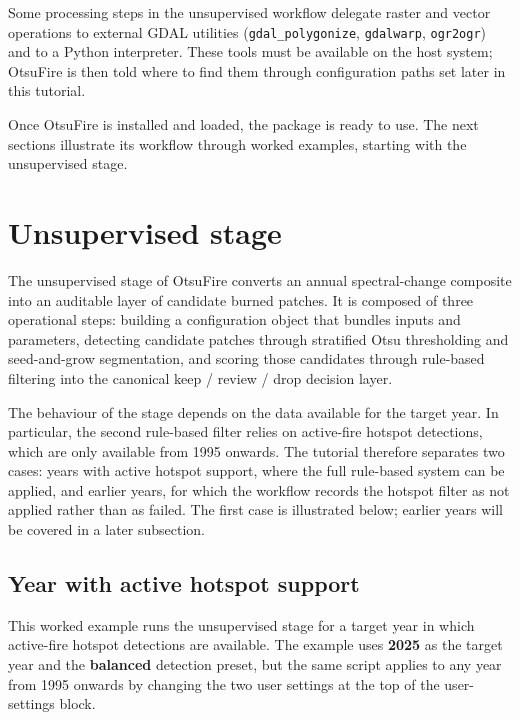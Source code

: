 \documentclass[
  british,
  a4paper,
]{scrbook}
\begin{document}
Some processing steps in the unsupervised workflow delegate raster and
vector operations to external GDAL utilities (\texttt{gdal\_polygonize},
\texttt{gdalwarp}, \texttt{ogr2ogr}) and to a Python interpreter. These
tools must be available on the host system; OtsuFire is then told where
to find them through configuration paths set later in this tutorial.

Once OtsuFire is installed and loaded, the package is ready to use. The
next sections illustrate its workflow through worked examples, starting
with the unsupervised stage.

\section{Unsupervised stage}\label{unsupervised-stage-1}

The unsupervised stage of OtsuFire converts an annual spectral-change
composite into an auditable layer of candidate burned patches. It is
composed of three operational steps: building a configuration object
that bundles inputs and parameters, detecting candidate patches through
stratified Otsu thresholding and seed-and-grow segmentation, and scoring
those candidates through rule-based filtering into the canonical keep /
review / drop decision layer.

The behaviour of the stage depends on the data available for the target
year. In particular, the second rule-based filter relies on active-fire
hotspot detections, which are only available from 1995 onwards. The
tutorial therefore separates two cases: years with active hotspot
support, where the full rule-based system can be applied, and earlier
years, for which the workflow records the hotspot filter as not applied
rather than as failed. The first case is illustrated below; earlier
years will be covered in a later subsection.

\subsection{Year with active hotspot
support}\label{year-with-active-hotspot-support}

This worked example runs the unsupervised stage for a target year in
which active-fire hotspot detections are available. The example uses
\textbf{2025} as the target year and the \textbf{balanced} detection
preset, but the same script applies to any year from 1995 onwards by
changing the two user settings at the top of the user-settings block.
\end{document}
